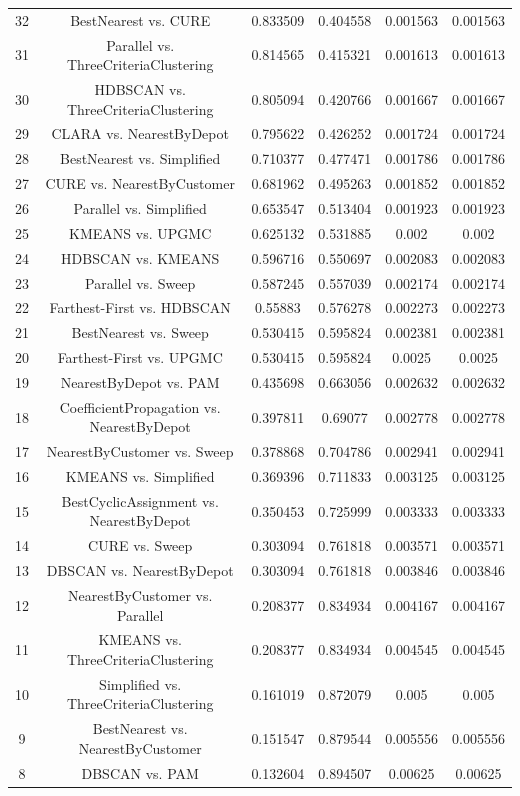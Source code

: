 \documentclass[a4paper,10pt]{article}
\begin{document}
\begin{landscape}
\begin{table}[!htp]
\begin{tabular}{cccccc}
32&BestNearest vs. CURE&0.833509&0.404558&0.001563&0.001563\\
31&Parallel vs. ThreeCriteriaClustering&0.814565&0.415321&0.001613&0.001613\\
30&HDBSCAN vs. ThreeCriteriaClustering&0.805094&0.420766&0.001667&0.001667\\
29&CLARA vs. NearestByDepot&0.795622&0.426252&0.001724&0.001724\\
28&BestNearest vs. Simplified&0.710377&0.477471&0.001786&0.001786\\
27&CURE vs. NearestByCustomer&0.681962&0.495263&0.001852&0.001852\\
26&Parallel vs. Simplified&0.653547&0.513404&0.001923&0.001923\\
25&KMEANS vs. UPGMC&0.625132&0.531885&0.002&0.002\\
24&HDBSCAN vs. KMEANS&0.596716&0.550697&0.002083&0.002083\\
23&Parallel vs. Sweep&0.587245&0.557039&0.002174&0.002174\\
22&Farthest-First vs. HDBSCAN&0.55883&0.576278&0.002273&0.002273\\
21&BestNearest vs. Sweep&0.530415&0.595824&0.002381&0.002381\\
20&Farthest-First vs. UPGMC&0.530415&0.595824&0.0025&0.0025\\
19&NearestByDepot vs. PAM&0.435698&0.663056&0.002632&0.002632\\
18&CoefficientPropagation vs. NearestByDepot&0.397811&0.69077&0.002778&0.002778\\
17&NearestByCustomer vs. Sweep&0.378868&0.704786&0.002941&0.002941\\
16&KMEANS vs. Simplified&0.369396&0.711833&0.003125&0.003125\\
15&BestCyclicAssignment vs. NearestByDepot&0.350453&0.725999&0.003333&0.003333\\
14&CURE vs. Sweep&0.303094&0.761818&0.003571&0.003571\\
13&DBSCAN vs. NearestByDepot&0.303094&0.761818&0.003846&0.003846\\
12&NearestByCustomer vs. Parallel&0.208377&0.834934&0.004167&0.004167\\
11&KMEANS vs. ThreeCriteriaClustering&0.208377&0.834934&0.004545&0.004545\\
10&Simplified vs. ThreeCriteriaClustering&0.161019&0.872079&0.005&0.005\\
9&BestNearest vs. NearestByCustomer&0.151547&0.879544&0.005556&0.005556\\
8&DBSCAN vs. PAM&0.132604&0.894507&0.00625&0.00625\\

\end{tabular}
\end{table}
\end{landscape}
\end{document}
